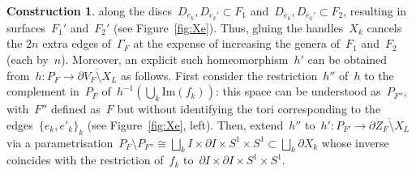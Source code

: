 \documentclass[10.9pt,a4paper]{amsart}
\theoremstyle{definition}
\newtheorem{construction}[theorem]{Construction}
\theoremstyle{remark}
\begin{document}
\begin{construction}
along the discs~$D_{e_k}, D_{e_k'} \subset F_1$ and~$D_{\overline{e}_k}, D_{\overline{e}_k'} \subset F_2$,  resulting in surfaces~$F_1'$ and~$F_2'$ (see Figure~\ref{fig:Xe}).
Thus, gluing the handles~$X_k$ cancels the $2n$ extra edges of~$\Gamma_F$ at the expense of increasing the genera of~$F_1$ and~$F_2$ (each by~$n$).
Moreover, an explicit such homeomorphism~$h'$ can be obtained from~$h\colon P_F\to\overline{\partial V_F \setminus X_L}$ as follows. First consider the restriction~$h''$ of~$h$ to the complement in~$P_F$ of~$h^{-1}(\bigcup_k\text{Im}(f_k))$: this space can be understood as~$P_{F''}$, with~$F''$ defined as~$F$ but without identifying
the tori corresponding to the edges~$\{e_k,e'_k\}_k$ (see Figure~\ref{fig:Xe}, left). Then, extend~$h''$ to~$h'\colon P_{F'} \to \overline{\partial Z_F\setminus X_L}$ via a parametrisation~$P_F\setminus P_{F''}\cong \bigsqcup_k I\times\partial I\times S^1\times S^1\subset\bigsqcup_k\partial X_k$ whose inverse coincides with the restriction of~$f_k$ to~$\partial I\times \partial I\times S^1\times S^1$.
\end{construction}
\end{document}

